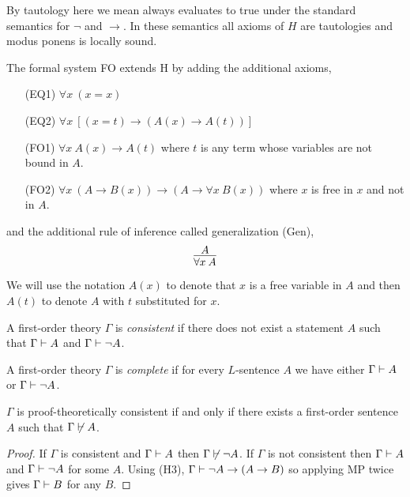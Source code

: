 \documentclass[12pt]{article}
\newcommand{\uq}[1]{\forall{#1} \:}
\begin{document}
\begin{remark}
By tautology here we mean always evaluates to true under the standard semantics for $\neg$ and $\to$. In these semantics all axioms of $H$ are tautologies and modus ponens is locally sound. 
\end{remark}

\begin{definition}
The formal system FO extends H by adding the additional axioms,
\begin{enumerate}
\item[(EQ1)] $\uq{x} (x = x)$
\item[(EQ2)] $\uq{x} [(x = t) \to (A(x) \to A(t))]$
\item[(FO1)] $\uq{x} A(x) \to A(t)$ where $t$ is any term whose variables are not bound in $A$. 
\item[(FO2)] $\uq{x} (A \to B(x)) \to (A \to \uq{x} B(x))$ where $x$ is free in $x$ and not in $A$. 
\end{enumerate}
and the additional rule of inference called generalization (Gen),
\[ \infer{\uq{x} A}{A} \]
\end{definition}

\begin{remark}
We will use the notation $A(x)$ to denote that $x$ is a free variable in $A$ and then $A(t)$ to denote $A$ with $t$ substituted for $x$. 

\end{remark}

\begin{definition}
A first-order theory $\Gamma$ is \textit{consistent} if there does not exist a statement $A$ such that $\Gamma \vdash A$ and $\Gamma \vdash \neg A$. 
\end{definition}

\begin{definition}
A first-order theory $\Gamma$ is \textit{complete} if for every $L$-sentence $A$ we have either $\Gamma \vdash A$ or $\Gamma \vdash \neg A$. 
\end{definition}


\begin{lemma}
$\Gamma$ is proof-theoretically consistent if and only if there exists a first-order sentence $A$ such that $\Gamma \not\vdash A$. 
\end{lemma}

\begin{proof}
If $\Gamma$ is consistent and $\Gamma \vdash A$ then $\Gamma \not\vdash \neg A$. If $\Gamma$ is not consistent then $\Gamma \vdash A$ and $\Gamma \vdash \neg A$ for some $A$. Using (H3), $\Gamma \vdash \neg A \to (A \to B)$ so applying MP twice gives $\Gamma \vdash B$ for any $B$. 
\end{proof}
\end{document}
